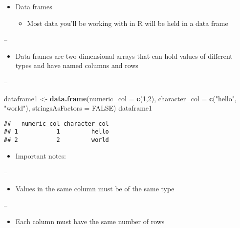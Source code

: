 \documentclass[]{article}
\newenvironment{Shaded}{\begin{snugshade}}{\end{snugshade}}
\newcommand{\DataTypeTok}[1]{\textcolor[rgb]{0.13,0.29,0.53}{#1}}
\newcommand{\DecValTok}[1]{\textcolor[rgb]{0.00,0.00,0.81}{#1}}
\newcommand{\KeywordTok}[1]{\textcolor[rgb]{0.13,0.29,0.53}{\textbf{#1}}}
\newcommand{\NormalTok}[1]{#1}
\newcommand{\OtherTok}[1]{\textcolor[rgb]{0.56,0.35,0.01}{#1}}
\newcommand{\StringTok}[1]{\textcolor[rgb]{0.31,0.60,0.02}{#1}}
\providecommand{\tightlist}{%
  \setlength{\itemsep}{0pt}\setlength{\parskip}{0pt}}
\begin{document}
\begin{itemize}
\tightlist
\item
  Data frames

  \begin{itemize}
  \tightlist
  \item
    Most data you'll be working with in R will be held in a data frame
  \end{itemize}
\end{itemize}

--

\begin{itemize}
\tightlist
\item
  Data frames are two dimensional arrays that can hold values of
  different types and have named columns and rows
\end{itemize}

--

\begin{Shaded}
\begin{Highlighting}[]
\NormalTok{dataframe1 <-}\StringTok{ }\KeywordTok{data.frame}\NormalTok{(}\DataTypeTok{numeric_col =} \KeywordTok{c}\NormalTok{(}\DecValTok{1}\NormalTok{,}\DecValTok{2}\NormalTok{),}
                         \DataTypeTok{character_col =} \KeywordTok{c}\NormalTok{(}\StringTok{"hello"}\NormalTok{, }\StringTok{"world"}\NormalTok{),}
                         \DataTypeTok{stringsAsFactors =} \OtherTok{FALSE}\NormalTok{)}
\NormalTok{dataframe1}
\end{Highlighting}
\end{Shaded}

\begin{verbatim}
##   numeric_col character_col
## 1           1         hello
## 2           2         world
\end{verbatim}

\begin{itemize}
\tightlist
\item
  Important notes:
\end{itemize}

--

\begin{itemize}
\tightlist
\item
  Values in the same column must be of the same type
\end{itemize}

--

\begin{itemize}
\tightlist
\item
  Each column must have the same number of rows
\end{itemize}
\end{document}
